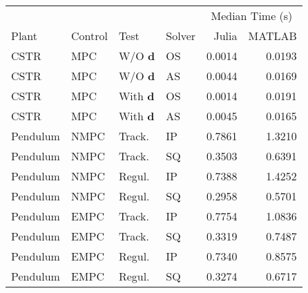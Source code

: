 \begin{tabular}{llllrr}
	
\toprule %

	  &	& & & \multicolumn{2}{c}{Median Time (s)} \\ \cmidrule(l){5-6}
Plant & Control & Test & Solver & Julia & MATLAB \\
\midrule %

CSTR		& MPC	& W/O $\mathbf{d}$	& OS & \num{0.0014} & \num{0.0193}	\\
CSTR		& MPC	& W/O $\mathbf{d}$	& AS & \num{0.0044} & \num{0.0169}	\\
CSTR		& MPC	& With $\mathbf{d}$ & OS & \num{0.0014} & \num{0.0191}	\\
CSTR		& MPC	& With $\mathbf{d}$ & AS & \num{0.0045} & \num{0.0165}	\\
Pendulum 	& NMPC	& Track. 	   		& IP & \num{0.7861} & \num{1.3210}	\\
Pendulum 	& NMPC	& Track. 	   		& SQ & \num{0.3503} & \num{0.6391}	\\
Pendulum    & NMPC	& Regul. 			& IP & \num{0.7388} & \num{1.4252} 	\\
Pendulum    & NMPC	& Regul. 			& SQ & \num{0.2958} & \num{0.5701} 	\\
Pendulum    & EMPC	& Track.			& IP & \num{0.7754} & \num{1.0836} 	\\
Pendulum    & EMPC	& Track.			& SQ & \num{0.3319} & \num{0.7487} 	\\
Pendulum	& EMPC	& Regul. 			& IP & \num{0.7340} & \num{0.8575} 	\\
Pendulum	& EMPC	& Regul. 			& SQ & \num{0.3274} & \num{0.6717}  \\
	
\bottomrule %
	
\end{tabular}